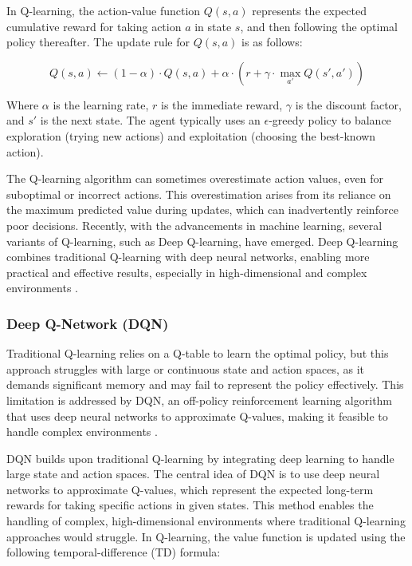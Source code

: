 \documentclass[preprint,12pt]{elsarticle}
\begin{document}
In Q-learning, the action-value function \(Q(s,a)\) represents the expected cumulative reward for taking action \(a\) in state \(s\), and then following the optimal policy thereafter. The update rule for \(Q(s,a)\) is as follows:

\[
Q(s,a) \leftarrow (1 - \alpha) \cdot Q(s,a) + \alpha \cdot \left( r + \gamma \cdot \max_{a'} Q(s',a') \right)
\]

Where \( \alpha \) is the learning rate, \( r \) is the immediate reward, \( \gamma \) is the discount factor, and \( s' \) is the next state. The agent typically uses an \(\epsilon\)-greedy policy to balance exploration (trying new actions) and exploitation (choosing the best-known action).


The Q-learning algorithm can sometimes overestimate action values, even for suboptimal or incorrect actions. This overestimation arises from its reliance on the maximum predicted value during updates, which can inadvertently reinforce poor decisions. Recently, with the advancements in machine learning, several variants of Q-learning, such as Deep Q-learning, have emerged. Deep Q-learning combines traditional Q-learning with deep neural networks, enabling more practical and effective results, especially in high-dimensional and complex environments \cite{jang2019q}.



\subsubsection{Deep Q-Network (DQN)}

Traditional Q-learning relies on a Q-table to learn the optimal policy, but this approach struggles with large or continuous state and action spaces, as it demands significant memory and may fail to represent the policy effectively. This limitation is addressed by DQN, an off-policy reinforcement learning algorithm that uses deep neural networks to approximate Q-values, making it feasible to handle complex environments \cite{lv2019path}.

DQN builds upon traditional Q-learning by integrating deep learning to handle large state and action spaces. The central idea of DQN is to use deep neural networks to approximate Q-values, which represent the expected long-term rewards for taking specific actions in given states. This method enables the handling of complex, high-dimensional environments where traditional Q-learning approaches would struggle. In Q-learning, the value function is updated using the following temporal-difference (TD) formula:
\end{document}
